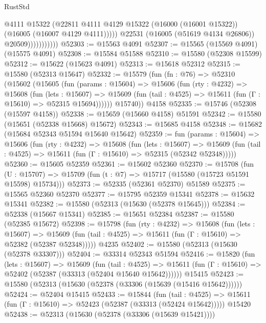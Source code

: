 \begin{lexlean}{RustStd}
\begin{coremodule}
                              @4111
                              @15322
                              (@22811
                                @4111
                                @4129
                                @15322
                                (@16000 (@16001 @15322))
                                (@16005 (@16007 @4129 @4111)))))
                          @22531
                          (@16005 (@51619 @4134 @26806))
                          @20509)))))))))))
@52303 := @15563 @4091
@52307 := @15565 (@15569 @4091) (@15575 @4091)
@52308 := @15584 @51588
@52310 := @15580 (@52308 @15599)
@52312 := @15622 (@15623 @4091)
@52313 := @15618 @52312
@52315 := @15580 (@52313 @15647)
@52332 := @15579
    (fun (fn : @76) =>
    @52310
      (@15602
        (@15605
          (fun (params : @15604) =>
          @15606
            (fun (rty : @4232) =>
            @15608
              (fun (lets : @15607) =>
              @15609 (fun (tail : @4525) => @15611 (fun (Γ : @15610) => @52315 @15694))))))
        @15740))
    @4158
@52335 := @15746 (@52308 (@15597 @4158))
@52338 := @15659 (@15660 @4158) @51591
@52342 := @15580 (@15651 (@52338 @15668) @15672)
@52343 := @15685 @4158
@52348 := @15682 (@15684 @52343 @51594 @15640 @15642)
@52359 := fun (params : @15604) =>
  @15606
    (fun (rty : @4232) =>
    @15608
      (fun (lets : @15607) =>
      @15609 (fun (tail : @4525) => @15611 (fun (Γ : @15610) => @52315 (@52342 @52348)))))
@52360 := @15605 @52359
@52361 := @15602 @52360
@52370 := @15708
    (fun (U : @15707) => @15709 (fun (t : @7) => @15717 (@15580 (@15723 @51591 @15598) @15734)))
@52373 := @52335 (@52361 @52370) @51589
@52375 := @15565 @52360 @52370
@52377 := @15795 @52359 @15341
@52378 := @15632 @15341
@52382 := @15580 (@52313 (@15630 (@52378 @15645)))
@52384 := @52338 (@15667 @15341)
@52385 := @15651 @52384
@52387 := @15580 (@52385 @15672)
@52398 := @15798
    (fun (rty : @4232) =>
    @15608
      (fun (lets : @15607) =>
      @15609 (fun (tail : @4525) => @15611 (fun (Γ : @15610) => @52382 (@52387 @52348)))))
    @4235
@52402 := @15580 (@52313 (@15630 (@52378 @33307)))
@52404 := @33314 @52343 @51594
@52416 := @15820
    (fun (lets : @15607) =>
    @15609
      (fun (tail : @4525) =>
      @15611 (fun (Γ : @15610) => @52402 (@52387 (@33313 (@52404 @15640 @15642))))))
    @15415
@52423 := @15580 (@52313 (@15630 (@52378 (@33306 (@15639 (@15416 @15642))))))
@52424 := @52404 @15415
@52433 := @15844
    (fun (tail : @4525) => @15611 (fun (Γ : @15610) => @52423 (@52387 (@33313 (@52424 @15642)))))
    @15420
@52438 := @52313 (@15630 (@52378 (@33306 (@15639 @15421))))

\end{coremodule}
\end{lexlean}
